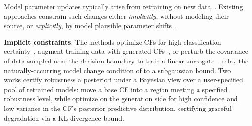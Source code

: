 Model parameter updates typically arise from retraining on new data~\cite{rawal2020algorithmic}. Existing approaches constrain such changes either \emph{implicitly}, without modeling their source, or \emph{explicitly}, by model plausible parameter shifts .

\textbf{Implicit constraints.}
The methods optimize CFs for high classification certainty~\cite{dutta2022robust,Hamman2023Robust,DBLP:conf/aaai/JiangL0T23}, augment training data with generated CFs~\cite{ferrario2022robustness}, or perturb the covariance of data sampled near the decision boundary to train a linear surrogate~\cite{DBLP:journals/ior/BuiNYN25}. \citet{xu2024generally} relax the naturally-occurring model change condition of \citet{Hamman2023Robust} to a subgaussian bound. Two works certify robustness a posteriori under a Bayesian view over a user-specified pool of retrained models: \citet{stkepka2025counterfactual} move a base CF into a region meeting a specified robustness level, while \citet{duell2026provably} optimize on the generation side for high confidence and low variance in the CF's posterior predictive distribution, certifying graceful degradation via a KL-divergence bound.


